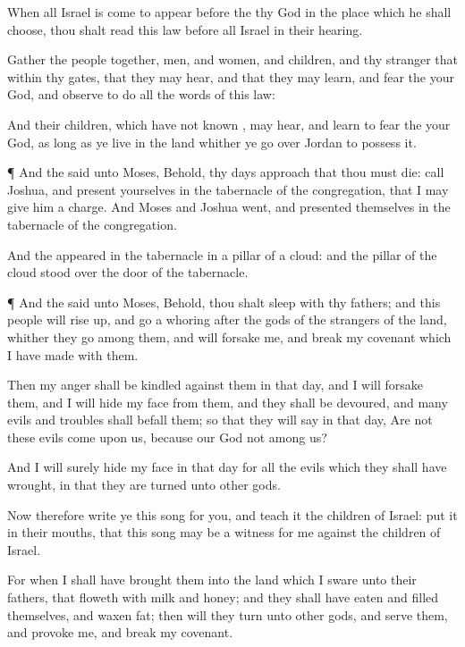 {When all
Israel is
come to
appear
before the
{} thy
God in the
place which he shall
choose, thou shalt
read this
law before all
Israel in their
hearing.

Gather the
people
together,
men, and
women, and
children, and thy
stranger that
{} within thy
gates, that they may
hear, and that they may
learn, and
fear the
{} your
God, and
observe to
do all the
words of this
law:

And
{} their
children, which have not
known
{}, may
hear, and
learn to
fear the
{} your
God, as long
as ye
live in the
land whither ye go
over
Jordan to
possess it.


\par }{\PP {}¶ And the
{}
said unto
Moses, Behold, thy
days
approach that thou must
die:
call
Joshua, and
present yourselves in the
tabernacle of the
congregation, that I may give him a
charge. And
Moses and
Joshua
went, and
presented themselves in the
tabernacle of the
congregation.

And the
{}
appeared in the
tabernacle in a
pillar of a
cloud: and the
pillar of the
cloud
stood over the
door of the
tabernacle.


\par }{\PP {}¶ And the
{}
said unto
Moses, Behold, thou shalt
sleep with thy
fathers; and this
people will rise
up, and go a
whoring
after the
gods of the
strangers of the
land, whither they
go
{}
among them, and will
forsake me, and
break my
covenant which I have
made with them.

Then my
anger shall be
kindled against them in that
day, and I will
forsake them, and I will
hide my
face from them, and they shall be
devoured, and
many
evils and
troubles shall
befall them; so that they will
say in that
day, Are not these
evils
come upon us, because our
God
{} not
among us?

And I will
surely
hide my
face in that
day for all the
evils which they shall have
wrought, in
that they are
turned unto
other
gods.

Now therefore
write ye this
song for you, and
teach it the
children of
Israel:
put it in their
mouths, that this
song may be a
witness for me against the
children of
Israel.

For when I shall have
brought them into the
land which I
sware unto their
fathers, that
floweth with
milk and
honey; and they shall have
eaten and
filled themselves, and waxen
fat; then will they
turn unto
other
gods, and
serve them, and
provoke me, and
break my
covenant.

}

